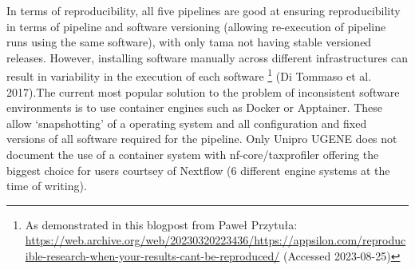 \documentclass[
]{article}
\begin{document}
In terms of reproducibility, all five pipelines are good at ensuring
reproducibility in terms of pipeline and software versioning (allowing
re-execution of pipeline runs using the same software), with only tama
not having stable versioned releases. However, installing software
manually across different infrastructures can result in variability in
the execution of each software \footnote{As demonstrated in this
  blogpost from Paweł Przytuła:
  \url{https://web.archive.org/web/20230320223436/https://appsilon.com/reproducible-research-when-your-results-cant-be-reproduced/}
  (Accessed 2023-08-25)} (Di Tommaso et al. 2017).The current most
popular solution to the problem of inconsistent software environments is
to use container engines such as Docker or Apptainer. These allow
`snapshotting' of a operating system and all configuration and fixed
versions of all software required for the pipeline. Only Unipro UGENE
does not document the use of a container system with nf-core/taxprofiler
offering the biggest choice for users courtsey of Nextflow (6 different
engine systems at the time of writing).
\end{document}

